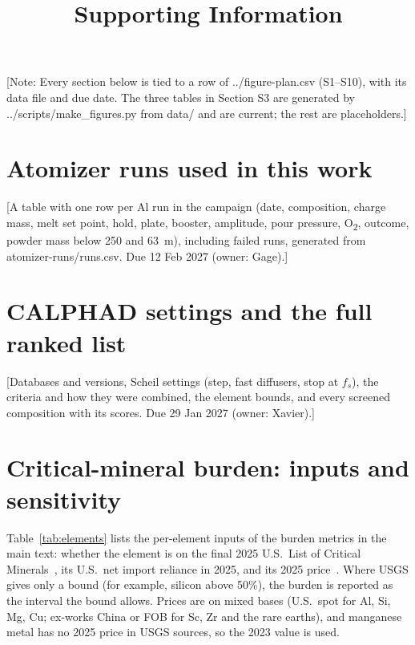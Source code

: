 \documentclass[11pt]{article}
\title{Supporting Information\\[4pt]\large \placeholder{Title as in the main text}}
\author{\placeholder{Authors}}
\date{\placeholder{Date}}
\newcommand{\placeholder}[1]{\textcolor{red!75!black}{[#1]}}
\newcommand{\note}[1]{\textcolor{blue!70!black}{\textsf{\footnotesize [Note: #1]}}}
\begin{document}
\maketitle

\note{Every section below is tied to a row of ../figure-plan.csv (S1--S10), with its data file and due date. The three tables in Section S3 are generated by ../scripts/make\_figures.py from data/ and are current; the rest are placeholders.}

\section{Atomizer runs used in this work}
\placeholder{A table with one row per Al run in the campaign (date, composition, charge mass, melt set point, hold, plate, booster, amplitude, pour pressure, O\textsubscript{2}, outcome, powder mass below 250 and 63~\textmu m), including failed runs, generated from atomizer-runs/runs.csv. Due 12 Feb 2027 (owner: Gage).}

\section{CALPHAD settings and the full ranked list}
\placeholder{Databases and versions, Scheil settings (step, fast diffusers, stop at $f_s$), the criteria and how they were combined, the element bounds, and every screened composition with its scores. Due 29 Jan 2027 (owner: Xavier).}

\section{Critical-mineral burden: inputs and sensitivity}
Table~\ref{tab:elements} lists the per-element inputs of the burden metrics in the main text: whether the element is on the final 2025 U.S.\ List of Critical Minerals~\cite{fr2025}, its U.S.\ net import reliance in 2025, and its 2025 price~\cite{usgs2026}. Where USGS gives only a bound (for example, silicon above 50\%), the burden is reported as the interval the bound allows. Prices are on mixed bases (U.S.\ spot for Al, Si, Mg, Cu; ex-works China or FOB for Sc, Zr and the rare earths), and manganese metal has no 2025 price in USGS sources, so the 2023 value is used.

\begin{table}[htbp]
  \centering\scriptsize
  \caption{Per-element inputs of the burden metrics (data/element-criticality.csv).}
  \label{tab:elements}
  \resizebox{\textwidth}{!}{}
\end{table}
\end{document}
